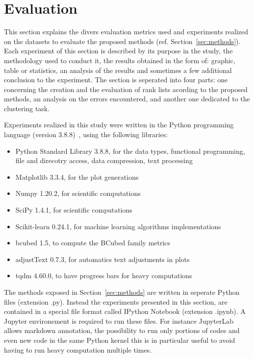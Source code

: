 \section{Evaluation \label{sec:evaluation}}

This section explains the divers evaluation metrics used and experiments realized on the datasets to evaluate the proposed methods (ref. Section~\ref{sec:methods}).
Each experiment of this section is described by its purpose in the study, the methodology used to conduct it, the results obtained in the form of: graphic, table or statistics, an analysis of the results and sometimes a few additional conclusion to the experiment.
The section is seperated into four parts: one concerning the creation and the evaluation of rank lists acording to the proposed methods, an analysis on the errors encountered, and another one dedicated to the clustering task.

Experiments realized in this study were written in the Python programming language (version 3.8.8)~\cite{python}, using the following libraries:
\begin{itemize}
  \item Python Standard Library 3.8.8, for the data types, functional programming, file and direcotry access, data compression, text processing~\cite{python_standard_library}
  \item Matplotlib 3.3.4, for the plot generations~\cite{matplotlib}
  \item Numpy 1.20.2, for scientific computations~\cite{numpy}
  \item SciPy 1.4.1, for scientific computations~\cite{scipy}
  \item Scikit-learn 0.24.1, for machine learning algorithms implementations~\cite{sklearn}
  \item bcubed 1.5, to compute the BCubed family metrics~\cite{bcubed_gh}
  \item adjustText 0.7.3, for automatics text adjustments in plots~\cite{adjustText}
  \item tqdm 4.60.0, to have progress bars for heavy computations~\cite{tqdm}
\end{itemize}
The methods exposed in Section~\ref{sec:methods} are written in seperate Python files (extension .py).
Instead the experiments presented in this section, are contained in a special file format called IPython Notebook (extension .ipynb).
A Jupyter environement is required to run these files.
For instance JupyterLab allows markdown annotation, the possibility to run only portions of codes and even new code in the same Python kernel this is in particular useful to avoid having to run heavy computation multiple times.





